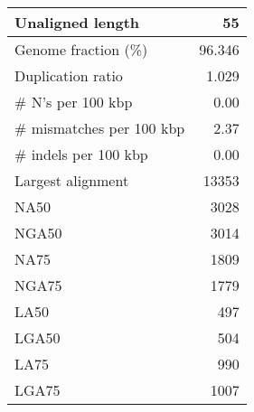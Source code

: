 \documentclass[12pt,a4paper]{article}
\begin{document}
\begin{table}[ht]
\begin{center}
\begin{tabular}{|l*{1}{|r}|}
Unaligned length & 55 \\ \hline
Genome fraction (\%) & 96.346 \\ \hline
Duplication ratio & 1.029 \\ \hline
\# N's per 100 kbp & 0.00 \\ \hline
\# mismatches per 100 kbp & 2.37 \\ \hline
\# indels per 100 kbp & 0.00 \\ \hline
Largest alignment & 13353 \\ \hline
NA50 & 3028 \\ \hline
NGA50 & 3014 \\ \hline
NA75 & 1809 \\ \hline
NGA75 & 1779 \\ \hline
LA50 & 497 \\ \hline
LGA50 & 504 \\ \hline
LA75 & 990 \\ \hline
LGA75 & 1007 \\ \hline
\end{tabular}
\end{center}
\end{table}
\end{document}
